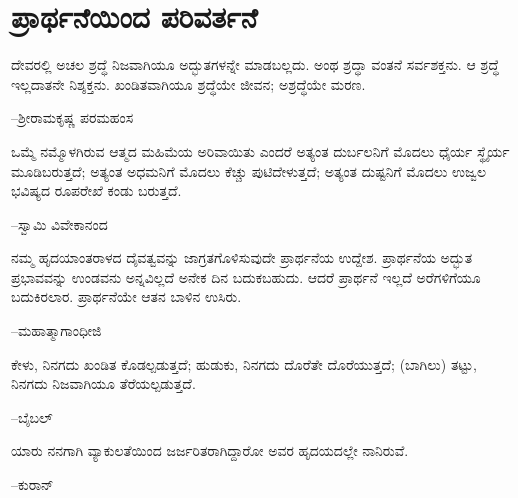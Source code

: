 
\chapter{ಪ್ರಾರ್ಥನೆಯಿಂದ ಪರಿವರ್ತನೆ}

\item ದೇವರಲ್ಲಿ ಅಚಲ ಶ್ರದ್ಧೆ ನಿಜವಾಗಿಯೂ ಅದ್ಭುತಗಳನ್ನೇ ಮಾಡಬಲ್ಲದು. ಅಂಥ ಶ್ರದ್ಧಾ ವಂತನೆ ಸರ್ವಶಕ್ತನು. ಆ ಶ್ರದ್ಧೆ ಇಲ್ಲದಾತನೇ ನಿಶ್ಶಕ್ತನು. ಖಂಡಿತವಾಗಿಯೂ ಶ್ರದ್ಧೆಯೇ ಜೀವನ; ಅಶ್ರದ್ಧೆಯೇ ಮರಣ.\\
\begin{flushright}
–ಶ‍್ರೀರಾಮಕೃಷ್ಣ ಪರಮಹಂಸ
\end{flushright}

 \item ಒಮ್ಮೆ ನಮ್ಮೊಳಗಿರುವ ಆತ್ಮದ ಮಹಿಮೆಯ ಅರಿವಾಯಿತು ಎಂದರೆ ಅತ್ಯಂತ ದುರ್ಬಲನಿಗೆ ಮೊದಲು ಧೈರ್ಯ ಸ್ಥೈರ್ಯ ಮೂಡಿಬರುತ್ತದೆ; ಅತ್ಯಂತ ಅಧಮನಿಗೆ ಮೊದಲು ಕೆಚ್ಚು ಪುಟಿದೇಳುತ್ತದೆ; ಅತ್ಯಂತ ದುಷ್ಟನಿಗೆ ಮೊದಲು ಉಜ್ವಲ ಭವಿಷ್ಯದ ರೂಪರೇಖೆ ಕಂಡು ಬರುತ್ತದೆ.\\
\begin{flushright}
–ಸ್ವಾಮಿ ವಿವೇಕಾನಂದ
\end{flushright}

 \item ನಮ್ಮ ಹೃದಯಾಂತರಾಳದ ದೈವತ್ವವನ್ನು ಜಾಗ್ರತಗೊಳಿಸುವುದೇ ಪ್ರಾರ್ಥನೆಯ ಉದ್ದೇಶ. ಪ್ರಾರ್ಥನೆಯ ಅದ್ಭುತ ಪ್ರಭಾವವನ್ನು ಉಂಡವನು ಅನ್ನವಿಲ್ಲದೆ ಅನೇಕ ದಿನ ಬದುಕಬಹುದು. ಆದರೆ ಪ್ರಾರ್ಥನೆ ಇಲ್ಲದೆ ಅರೆಗಳಿಗೆಯೂ ಬದುಕಿರಲಾರ. ಪ್ರಾರ್ಥನೆಯೇ ಆತನ ಬಾಳಿನ ಉಸಿರು.\\
\begin{flushright}
–ಮಹಾತ್ಮಾಗಾಂಧೀಜಿ
\end{flushright}

 \item ಕೇಳು, ನಿನಗದು ಖಂಡಿತ ಕೊಡಲ್ಪಡುತ್ತದೆ; ಹುಡುಕು, ನಿನಗದು ದೊರೆತೇ ದೊರೆಯುತ್ತದೆ; (ಬಾಗಿಲು) ತಟ್ಟು, ನಿನಗದು ನಿಜವಾಗಿಯೂ ತೆರೆಯಲ್ಪಡುತ್ತದೆ.\\
\begin{flushright}
–ಬೈಬಲ್​
\end{flushright}

 \item ಯಾರು ನನಗಾಗಿ ವ್ಯಾಕುಲತೆಯಿಂದ ಜರ್ಜರಿತರಾಗಿದ್ದಾರೋ ಅವರ ಹೃದಯದಲ್ಲೇ ನಾನಿರುವೆ.\\
\begin{flushright}
–ಕುರಾನ್​
\end{flushright}

 \item {}\\
\begin{flushright}
\end{flushright}



